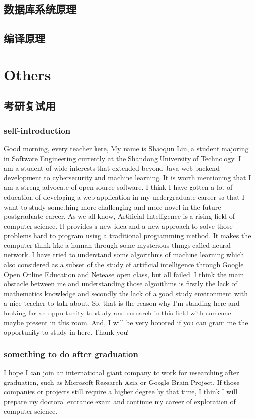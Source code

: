 \documentclass[a4paper]{report}
\begin{document}
\section{数据库系统原理}


\section{编译原理}


\chapter{Others}
\section{考研复试用}
\subsection{self-introduction}
Good morning, every teacher here, My name is Shaoqun Liu, a student majoring in Software Engineering currently at the Shandong University of Technology. I am a student of wide interests that extended beyond Java web backend development to cybersecurity and machine learning. It is worth mentioning that I am a strong advocate of open-source software. I think I have gotten a lot of education of developing a web application in my undergraduate career so that I want to study something more challenging and more novel in the future postgraduate career. As we all know, Artificial Intelligence is a rising field of computer science. It provides a new idea and a new approach to solve those problems hard to program using a traditional programming method. It makes the computer think like a human through some mysterious things called neural-network. I have tried to understand some algorithms of machine learning which also considered as a subset of the study of artificial intelligence through Google Open Online Education and Netease open class, but all failed. I think the main obstacle between me and understanding those algorithms is firstly the lack of mathematics knowledge and secondly the lack of a good study environment with a nice teacher to talk about. So, that is the reason why I'm standing here and looking for an opportunity to study and research in this field with someone maybe present in this room. And, I will be very honored if you can grant me the opportunity to study in here. Thank you!

\subsection{something to do after graduation}
I hope I can join an international giant company to work for researching after graduation, such as Microsoft Research Asia or Google Brain Project. If those companies or projects still require a higher degree by that time, I think I will prepare my doctoral entrance exam and continue my career of exploration of computer science.
\end{document}
